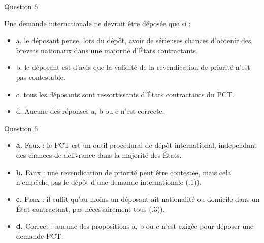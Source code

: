 \begin{frame}{Question 6}

\begin{block}{}
Une demande internationale ne devrait être déposée que si :

\begin{itemize}
  \item[$\circ$] a. le déposant pense, lors du dépôt, avoir de sérieuses chances d’obtenir des brevets 
  nationaux dans une majorité d’États contractants.   
  \item[$\circ$] b. le déposant est d’avis que la validité de la revendication de priorité n’est pas 
  contestable.   
  \item[$\circ$] c. tous les déposants sont ressortissants d’États contractants du PCT. 
  \item[$\bullet$] d. Aucune des réponses a, b ou c n’est correcte.
\end{itemize}

\end{block}

\end{frame}

\begin{frame}{Question 6}

\begin{itemize}
  \item[$\circ$] \textbf{a.} \; Faux : le PCT est un outil procédural de dépôt international,
  indépendant des chances de délivrance dans la majorité des États.

  \item[$\circ$] \textbf{b.} \; Faux : une revendication de priorité peut être contestée,
  mais cela n’empêche pas le dépôt d’une demande internationale
  (.1)).

  \item[$\circ$] \textbf{c.} \; Faux : il suffit qu’au moins un déposant ait nationalité ou domicile
  dans un État contractant, pas nécessairement tous
  (.3)).

  \item[$\bullet$] \textbf{d.} \; Correct : aucune des propositions a, b ou c n’est exigée pour déposer une demande PCT.
\end{itemize}

\end{frame}